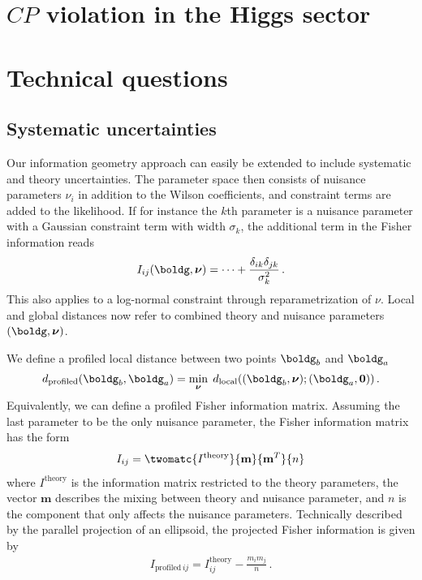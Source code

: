 \section{$CP$ violation in the Higgs sector}
\label{sec:information_CPV}


\section{Technical questions}
\label{sec:information_extensions}

\subsection{Systematic uncertainties}

Our information geometry approach can easily be extended to include
systematic and theory uncertainties. The parameter space then consists
of nuisance parameters $\nu_i$ in addition to the Wilson coefficients,
and constraint terms are added to the likelihood. If for instance the
$k$th parameter is a nuisance parameter with a Gaussian constraint
term with width $\sigma_k$, the additional term in the Fisher
information reads
%
\begin{align}
  I_{ij} (\boldg,\boldsymbol{\nu}) = \dots + \frac {\delta_{ik} \delta_{jk}} {\sigma_k^2} \,.
\end{align} 
%
This also applies to a log-normal constraint through reparametrization
of $\nu$.  Local and global distances now refer to combined theory and
nuisance parameters $(\boldg,\boldsymbol{\nu})$.

We define a profiled local distance between two points $\boldg_b$ and
$\boldg_a$
%
\begin{align}
  d_{\text{profiled}} (\boldg_b, \boldg_a)
  = \min_{\boldsymbol{\nu}}   \; d_{\text{local}}( (\boldg_b,\boldsymbol{\nu}) ;
  (\boldg_a , \mathbf{0} ) ) \,.
\end{align}
%
Equivalently, we can define a profiled Fisher information
matrix. Assuming the last parameter to be the only nuisance parameter,
the Fisher information matrix has the form
%
\begin{align}
  I_{ij} = \twomatc {I^{\text{theory}}} {\mathbf{m}} {\mathbf{m}^T} {n}
\end{align}
%
where $I^{\text{theory}}$ is the information matrix restricted to the theory
parameters, the vector $\mathbf{m}$ describes the mixing between
theory and nuisance parameter, and $n$ is the component that only
affects the nuisance parameters. Technically described by the parallel
projection of an ellipsoid, the projected Fisher information is given
by
%
\begin{align}
  I_{\text{profiled} \, ij} = I^{\text{theory}}_{ij} - \frac {m_i m_j} {n} \,.
\end{align}
\bigskip

